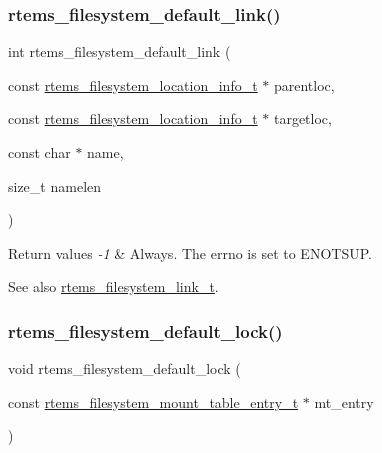 \subsubsection{\texorpdfstring{rtems\_filesystem\_default\_link()}{rtems\_filesystem\_default\_link()}}
{\footnotesize\ttfamily int rtems\+\_\+filesystem\+\_\+default\+\_\+link (\begin{DoxyParamCaption}\item[{const \mbox{\hyperlink{group__LibIO_ga3252b3d31ee3c49ffff0b7604a676864}{rtems\+\_\+filesystem\+\_\+location\+\_\+info\+\_\+t}} $\ast$}]{parentloc,  }\item[{const \mbox{\hyperlink{group__LibIO_ga3252b3d31ee3c49ffff0b7604a676864}{rtems\+\_\+filesystem\+\_\+location\+\_\+info\+\_\+t}} $\ast$}]{targetloc,  }\item[{const char $\ast$}]{name,  }\item[{size\+\_\+t}]{namelen }\end{DoxyParamCaption})}


\begin{DoxyRetVals}{Return values}
{\em -\/1} & Always. The errno is set to E\+N\+O\+T\+S\+UP.\\
\hline
\end{DoxyRetVals}
\begin{DoxySeeAlso}{See also}
\mbox{\hyperlink{group__LibIOFSOps_ga13198d873ccc0493d7ba970d4429502f}{rtems\+\_\+filesystem\+\_\+link\+\_\+t}}. 
\end{DoxySeeAlso}
\mbox{\label{group__LibIOFSOps_ga22adb86bb962a91df5c36619925c3a7b}} 
\subsubsection{\texorpdfstring{rtems\_filesystem\_default\_lock()}{rtems\_filesystem\_default\_lock()}}
{\footnotesize\ttfamily void rtems\+\_\+filesystem\+\_\+default\+\_\+lock (\begin{DoxyParamCaption}\item[{const \mbox{\hyperlink{structrtems__filesystem__mount__table__entry__tt}{rtems\+\_\+filesystem\+\_\+mount\+\_\+table\+\_\+entry\+\_\+t}} $\ast$}]{mt\+\_\+entry }\end{DoxyParamCaption})}



